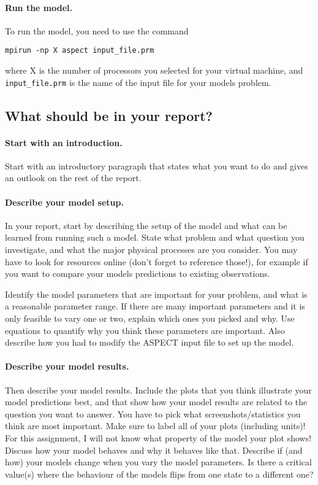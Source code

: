\documentclass[notitlepage]{article}
\begin{document}
\paragraph{Run the model.}
To run the model, you need to use the command 
\begin{verbatim}
mpirun -np X aspect input_file.prm
\end{verbatim}
where X is the number of processors you selected for your virtual machine, and \texttt{input\_file.prm} is the name of the
input file for your models problem. 


\subsection{What should be in your report?}

\paragraph{Start with an introduction.}
Start with an introductory paragraph that states what you want to do and gives an outlook on the rest of the report.

\paragraph{Describe your model setup.}
In your report, start by describing the setup of the model and what can be learned from running such a model. 
State what problem and what question you investigate, and what the major physical processes are you consider. 
You may have to look for resources online (don't forget to reference those!), 
for example if you want to compare your models predictions to existing observations. 

Identify the model parameters that are important for your problem, and what is a reasonable parameter range. 
If there are many important parameters and it is only feasible to vary one or two, explain which ones you picked and why. 
Use equations to quantify why you think these parameters are important. 
Also describe how you had to modify the ASPECT input file to set up the model. 

\paragraph{Describe your model results.}
Then describe your model results. Include the plots that you think illustrate your model predictions best, 
and that show how your model results are related to the question you want to answer. 
You have to pick what screenshots/statistics you think are most important. Make sure to label all of your plots
(including units)! For this assignment, I will not know what property of the model your plot shows!
Discuss how your model behaves and why it behaves like that. Describe if (and how) your models change when you vary the model parameters. 
Is there a critical value(s) where the behaviour of the models flips from one state to a different one?
\end{document}
